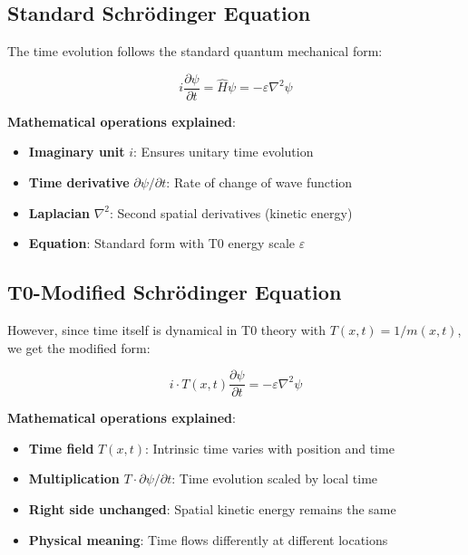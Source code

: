 	\subsection{Standard Schrödinger Equation}
	
	The time evolution follows the standard quantum mechanical form:
	
	\begin{equation}
		i\frac{\partial\psi}{\partial t} = \hat{H}\psi = -\varepsilon \nabla^2 \psi
		\label{eq:standard_schrodinger_t0}
	\end{equation}
	
	\textbf{Mathematical operations explained}:
	\begin{itemize}
		\item \textbf{Imaginary unit} $i$: Ensures unitary time evolution
		\item \textbf{Time derivative} $\partial\psi/\partial t$: Rate of change of wave function
		\item \textbf{Laplacian} $\nabla^2$: Second spatial derivatives (kinetic energy)
		\item \textbf{Equation}: Standard form with T0 energy scale $\varepsilon$
	\end{itemize}
	
	\subsection{T0-Modified Schrödinger Equation}
	
	However, since time itself is dynamical in T0 theory with $T(x,t) = 1/m(x,t)$, we get the modified form:
	
	\begin{equation}
		\boxed{i \cdot T(x,t) \frac{\partial\psi}{\partial t} = -\varepsilon \nabla^2 \psi}
		\label{eq:t0_modified_schrodinger}
	\end{equation}
	
	\textbf{Mathematical operations explained}:
	\begin{itemize}
		\item \textbf{Time field} $T(x,t)$: Intrinsic time varies with position and time
		\item \textbf{Multiplication} $T \cdot \partial\psi/\partial t$: Time evolution scaled by local time
		\item \textbf{Right side unchanged}: Spatial kinetic energy remains the same
		\item \textbf{Physical meaning}: Time flows differently at different locations
	\end{itemize}
	
